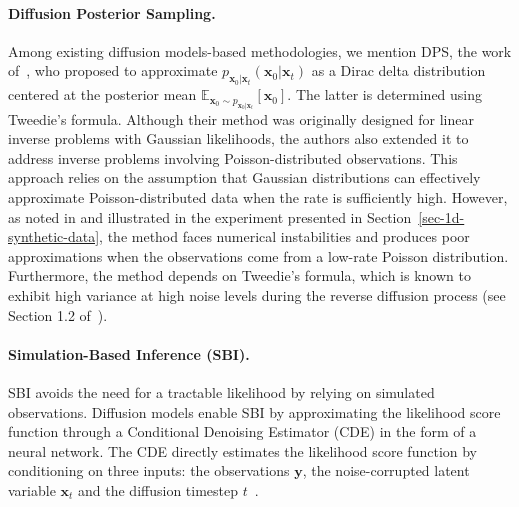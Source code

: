 \paragraph{Diffusion Posterior Sampling.} Among existing diffusion models-based methodologies, we mention DPS, the work of~\citet{chung2023}, who proposed to approximate $p_{\mathbf{x}_{0}\vert\mathbf{x}_t}(\mathbf{x}_0 \vert \mathbf{x}_t)$ as a Dirac delta distribution centered at the posterior mean $\mathbb{E}_{\mathbf{x}_{0}\sim p_{\mathbf{x}_{0}\vert\mathbf{x}_t}}[\mathbf{x}_0]$.
The latter is determined using Tweedie’s formula. Although their method was originally designed for linear inverse problems with Gaussian likelihoods, the authors also extended it to address inverse problems involving Poisson-distributed observations. 
This approach relies on the assumption that Gaussian distributions can effectively approximate Poisson-distributed data when the rate is sufficiently high. However, as noted in \citep[Appendix C.4]{chung2023} and illustrated in the experiment presented in Section~\ref{sec-1d-synthetic-data}, the method faces numerical instabilities and produces poor approximations when the observations come from a low-rate Poisson distribution. Furthermore, the method depends on Tweedie’s formula, which is known to exhibit high variance at high noise levels during the reverse diffusion process (see Section 1.2 of~\citet{target_score_matching}).


\paragraph{Simulation-Based Inference (SBI).} 
SBI avoids the need for a tractable likelihood by relying on simulated observations. Diffusion models enable SBI by approximating the likelihood score function through a Conditional Denoising Estimator (CDE) in the form of a neural network. The CDE directly estimates the likelihood score function by conditioning on three inputs: the observations $\mathbf{y}$, the noise-corrupted latent variable $\mathbf{x}_t$ and the diffusion timestep $t$~\citep{batzolis2021,simons2023}.

